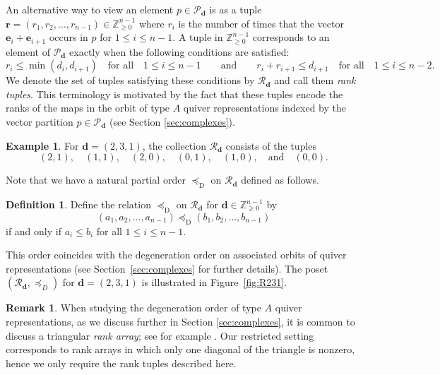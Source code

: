 \documentclass{amsart}
\def\PP{\mathcal{P}}
\def\RR{\mathcal{R}}
\def\bfd{{\mathbf{d}}}
\def\bfr{{\mathbf{r}}}
\theoremstyle{definition}
\newtheorem{definition}[theorem]{Definition}
\newtheorem{example}[theorem]{Example}
\newtheorem{remark}[theorem]{Remark}
\newcommand{\leqd}{\preceq_{\text{D}}}
\begin{document}
An alternative way to view an element $p\in\PP_\bfd$ is as a tuple $\bfr=(r_1,r_2,\ldots,r_{n-1})\in\mathbb{Z}^{n-1}_{\ge 0}$ where $r_i$ is the number of times that the vector $\mathbf{e}_i+\mathbf{e}_{i+1}$ occurs in $p$ for $1\le i\le n-1$. A tuple in $\mathbb{Z}_{\ge 0}^{n-1}$ corresponds to an element of $\PP_\bfd$ exactly when the following conditions are satisfied: \begin{equation}\label{eq:rankconditions}
r_i\leq \min(d_i,d_{i+1}) \quad\text{for all}\quad 1\leq i\leq n-1\qquad\text{and}\qquad r_i+r_{i+1}\leq d_{i+1}\quad\text{for all}\quad 1\leq i\leq n-2.    
\end{equation}
We denote the set of tuples satisfying these conditions by $\RR_\bfd$ and call them \emph{rank tuples}.
This terminology is motivated by the fact that these tuples encode the ranks of the maps
in the orbit of type $A$ quiver representations indexed by the vector partition $p\in\PP_\bfd$ (see Section \ref{sec:complexes}). 

\begin{example}\label{ex:RR}
    For $\mathbf{d}=(2,3,1)$, the collection $\mathcal{R}_\mathbf{d}$ consists of the tuples $$(2,1),\quad (1,1),\quad (2,0),\quad (0,1),\quad (1,0),\quad\text{and}\quad(0,0).$$
\end{example}

Note that we have a natural partial order $\leqd$ on $\RR_\bfd$ defined as follows.

\begin{definition}\label{def:vporder}
Define the relation $\leqd$ on $\RR_\bfd$ for $\mathbf{d}\in\mathbb{Z}^{n-1}_{\ge 0}$ by \[(a_1,a_2,\ldots,a_{n-1})\leqd(b_1,b_2,\ldots,b_{n-1})\]
if and only if $a_i\leq b_i$ for all $1\leq i\leq n-1$. 
\end{definition}

This order coincides with the degeneration order on associated orbits of quiver representations (see Section~\ref{sec:complexes} for further details). The poset $(\mathcal{R}_{\mathbf{d}}, \preceq_D)$ for $\mathbf{d}=(2,3,1)$ is illustrated in Figure~\ref{fig:R231}.


\begin{remark}
When studying the degeneration order of type $A$ quiver representations, as we discuss further in Section \ref{sec:complexes}, it is common to discuss a triangular \emph{rank array}; see for example \cite{abeasis1985degenerations}. Our restricted setting corresponds to rank arrays in which only one diagonal of the triangle is nonzero, hence we only require the rank tuples described here.
\end{remark}
\end{document}
